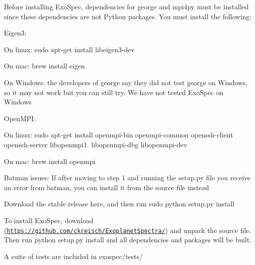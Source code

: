 \begin{DoxyItemize}
\item Before installing Exo\+Spec, dependencies for george and mpi4py must be installed since these dependencies are not Python packages. You must install the following\+:
\begin{DoxyItemize}
\item Eigen3\+:
\begin{DoxyItemize}
\item On linux\+: sudo apt-\/get install libeigen3-\/dev
\item On mac\+: brew install eigen
\item On Windows\+: the developers of george say they did not test george on Windows, so it may not work but you can still try. We have not tested Exo\+Spec on Windows
\end{DoxyItemize}
\item Open\+M\+PI\+:
\begin{DoxyItemize}
\item On linux\+: sudo apt-\/get install openmpi-\/bin openmpi-\/common openssh-\/client openssh-\/server libopenmpi1. libopenmpi-\/dbg libopenmpi-\/dev
\item On mac\+: brew install openmpi
\end{DoxyItemize}
\item Batman issues\+: If after moving to step 1 and running the setup.\+py file you receive an error from batman, you can install it from the source file instead
\begin{DoxyItemize}
\item Download the stable release here, and then run sudo python setup.\+py install
\end{DoxyItemize}
\end{DoxyItemize}
\item To install Exo\+Spec, download (\href{https://github.com/ckreisch/ExoplanetSpectra/}{\tt https\+://github.\+com/ckreisch/\+Exoplanet\+Spectra/}) and unpack the source file. Then run python setup.\+py install and all dependencies and packages will be built.
\item A suite of tests are included in exospec/tests/ 
\end{DoxyItemize}